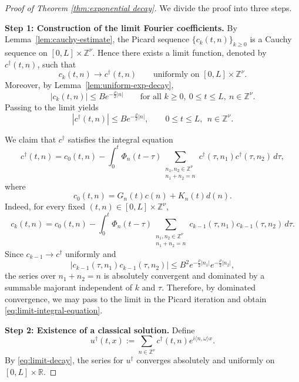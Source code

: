\documentclass[10pt,a4paper]{amsart}
\begin{document}
\begin{proof}[Proof of Theorem \ref{thm:exponential decay}]
We divide the proof into three steps.

\medskip
\noindent
\textbf{Step 1: Construction of the limit Fourier coefficients.}
By Lemma~\ref{lem:cauchy-estimate}, the Picard sequence
$\{c_k(t,n)\}_{k\geq 0}$ is a Cauchy sequence on $[0,L]\times \mathbb{Z}^{\nu}$.
Hence there exists a limit function, denoted by $c^{\dagger}(t,n)$, such that
\[
c_k(t,n)\longrightarrow c^{\dagger}(t,n)
\qquad \text{uniformly on } [0,L]\times \mathbb{Z}^{\nu}.
\]
Moreover, by Lemma~\ref{lem:uniform-exp-decay},
\[
|c_k(t,n)|\leq B e^{-\frac{\rho}{2}|n|}
\qquad
\text{for all } k\geq 0,\ 0\leq t\leq L,\ n\in \mathbb{Z}^{\nu}.
\]
Passing to the limit yields
\begin{equation}\label{eq:limit-decay}
|c^{\dagger}(t,n)|\leq B e^{-\frac{\rho}{2}|n|},
\qquad
0\leq t\leq L,\ \ n\in \mathbb{Z}^{\nu}.
\end{equation}

We claim that $c^{\dagger}$ satisfies the integral equation
\begin{equation}\label{eq:limit-integral-equation}
c^{\dagger}(t,n)
=
c_0(t,n)
-
\int_0^t \Phi_n(t-\tau)
\sum_{\substack{n_1,n_2\in \mathbb{Z}^{\nu}\\ n_1+n_2=n}}
c^{\dagger}(\tau,n_1)c^{\dagger}(\tau,n_2)\,d\tau,
\end{equation}
where
\[
c_0(t,n)=G_n(t)c(n)+K_n(t)d(n).
\]
Indeed, for every fixed $(t,n)\in [0,L]\times \mathbb{Z}^{\nu}$,
\[
c_k(t,n)
=
c_0(t,n)
-
\int_0^t \Phi_n(t-\tau)
\sum_{\substack{n_1,n_2\in \mathbb{Z}^{\nu}\\ n_1+n_2=n}}
c_{k-1}(\tau,n_1)c_{k-1}(\tau,n_2)\,d\tau.
\]
Since $c_{k-1}\to c^{\dagger}$ uniformly and
\[
|c_{k-1}(\tau,n_1)c_{k-1}(\tau,n_2)|
\leq
B^2 e^{-\frac{\rho}{2}|n_1|}e^{-\frac{\rho}{2}|n_2|},
\]
the series over $n_1+n_2=n$ is absolutely convergent and dominated by a summable
majorant independent of $k$ and $\tau$. Therefore, by dominated convergence, we may
pass to the limit in the Picard iteration and obtain
\eqref{eq:limit-integral-equation}.

\medskip
\noindent
\textbf{Step 2: Existence of a classical solution.}
Define
\begin{equation*}
u^{\dagger}(t,x)
:=
\sum_{n\in \mathbb{Z}^{\nu}} c^{\dagger}(t,n)e^{i\langle n,\omega\rangle x}.
\end{equation*}
By \eqref{eq:limit-decay}, the series for $u^{\dagger}$ converges absolutely and
uniformly on $[0,L]\times \mathbb{R}$.


\end{proof}
\end{document}
